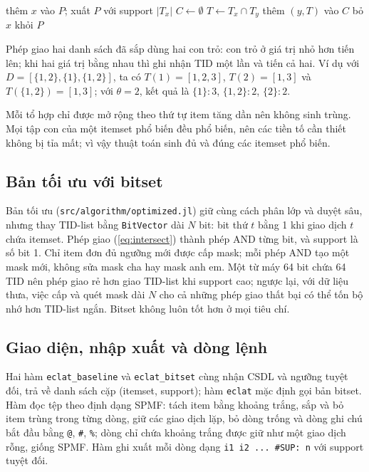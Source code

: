 \begin{algorithm}[t]
\caption{Mở rộng lớp tiền tố}
\label{alg:dfs}
\begin{algorithmic}[1]
    \State thêm $x$ vào $P$; xuất $P$ với support $|T_x|$
    \State $C \gets \emptyset$
      \State $T \gets T_x \cap T_y$
       thêm $(y, T)$ vào $C$ \EndIf
    \EndFor
      \EndIf
    \State bỏ $x$ khỏi $P$
  \EndFor
\EndProcedure
\end{algorithmic}
\end{algorithm}

Phép giao hai danh sách đã sắp dùng hai con trỏ: con trỏ ở giá trị nhỏ hơn tiến lên; khi hai giá trị bằng nhau
thì ghi nhận TID một lần và tiến cả hai. Ví dụ với $D = [\{1,2\}, \{1\}, \{1,2\}]$, ta có $T(1) = [1,2,3]$,
$T(2) = [1,3]$ và $T(\{1,2\}) = [1,3]$; với $\theta = 2$, kết quả là $\{1\}{:}3$, $\{1,2\}{:}2$, $\{2\}{:}2$.

Mỗi tổ hợp chỉ được mở rộng theo thứ tự item tăng dần nên không sinh trùng. Mọi tập con của một itemset phổ
biến đều phổ biến, nên các tiền tố cần thiết không bị tỉa mất; vì vậy thuật toán sinh đủ và đúng các itemset
phổ biến.

\subsection{Bản tối ưu với bitset}

Bản tối ưu (\texttt{src/algorithm/optimized.jl}) giữ cùng cách phân lớp và duyệt sâu, nhưng thay TID-list bằng
\texttt{BitVector} dài $N$ bit: bit thứ $t$ bằng 1 khi giao dịch $t$ chứa itemset. Phép giao
(\ref{eq:intersect}) thành phép AND từng bit, và support là số bit 1. Chỉ item đơn đủ ngưỡng mới được cấp mask;
mỗi phép AND tạo một mask mới, không sửa mask cha hay mask anh em. Một từ máy 64 bit chứa 64 TID nên phép giao
rẻ hơn giao TID-list khi support cao; ngược lại, với dữ liệu thưa, việc cấp và quét mask dài $N$ cho cả những phép giao thất bại
có thể tốn bộ nhớ hơn TID-list ngắn. Bitset không luôn tốt hơn ở mọi tiêu chí.

\subsection{Giao diện, nhập xuất và dòng lệnh}

Hai hàm \texttt{eclat\_baseline} và \texttt{eclat\_bitset} cùng nhận CSDL và ngưỡng tuyệt đối, trả về danh sách
cặp (itemset, support); hàm \texttt{eclat} mặc định gọi bản bitset. Hàm đọc tệp theo định dạng SPMF: tách item
bằng khoảng trắng, sắp và bỏ item trùng trong từng dòng, giữ các giao dịch lặp, bỏ dòng trống và dòng ghi chú
bắt đầu bằng \texttt{@}, \texttt{\#}, \texttt{\%}; dòng chỉ chứa khoảng trắng được giữ như một giao dịch rỗng,
giống SPMF. Hàm ghi xuất mỗi dòng dạng \texttt{i1 i2 ... \#SUP: n} với support tuyệt đối.

